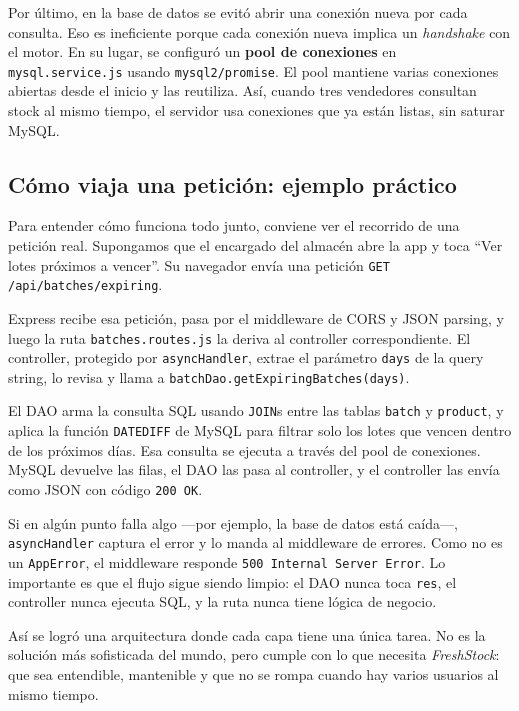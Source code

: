 \documentclass[journal]{IEEEtran}
\newcommand{\app}{\textit{FreshStock}}
\begin{document}
	Por \'{u}ltimo, en la base de datos se evit\'{o} abrir una
	conexi\'{o}n nueva por cada consulta. Eso es ineficiente porque
	cada conexi\'{o}n nueva implica un \emph{handshake} con el
	motor. En su lugar, se configur\'{o} un \textbf{pool de
		conexiones} en \texttt{mysql.service.js} usando
	\texttt{mysql2/promise}. El pool mantiene varias conexiones
	abiertas desde el inicio y las reutiliza. As\'{i}, cuando tres
	vendedores consultan stock al mismo tiempo, el servidor usa
	conexiones que ya est\'{a}n listas, sin saturar MySQL.
	
	\subsection{C\'{o}mo viaja una petici\'{o}n: ejemplo pr\'{a}ctico}
	\label{subsec:traza}
	
	Para entender c\'{o}mo funciona todo junto, conviene ver el
	recorrido de una petici\'{o}n real. Supongamos que el encargado
	del almac\'{e}n abre la app y toca ``Ver lotes pr\'{o}ximos a
	vencer''. Su navegador env\'{i}a una petici\'{o}n
	\texttt{GET /api/batches/expiring}.
	
	Express recibe esa petici\'{o}n, pasa por el middleware de CORS y
	JSON parsing, y luego la ruta \texttt{batches.routes.js} la
	deriva al controller correspondiente. El controller, protegido
	por \texttt{asyncHandler}, extrae el par\'{a}metro
	\texttt{days} de la query string, lo revisa y llama a
	\texttt{batchDao.getExpiringBatches(days)}.
	
	El DAO arma la consulta SQL usando \texttt{JOIN}s entre las
	tablas \texttt{batch} y \texttt{product}, y aplica la funci\'{o}n
	\texttt{DATEDIFF} de MySQL para filtrar solo los lotes que vencen
	dentro de los pr\'{o}ximos d\'{i}as. Esa consulta se ejecuta a
	trav\'{e}s del pool de conexiones. MySQL devuelve las filas, el
	DAO las pasa al controller, y el controller las env\'{i}a como
	JSON con c\'{o}digo \texttt{200 OK}.
	
	Si en alg\'{u}n punto falla algo ---por ejemplo, la base de datos
	est\'{a} ca\'{i}da---, \texttt{asyncHandler} captura el error y
	lo manda al middleware de errores. Como no es un \texttt{AppError},
	el middleware responde \texttt{500 Internal Server Error}. Lo
	importante es que el flujo sigue siendo limpio: el DAO nunca toca
	\texttt{res}, el controller nunca ejecuta SQL, y la ruta nunca
	tiene l\'{o}gica de negocio.
	
	As\'{i} se logr\'{o} una arquitectura donde cada capa tiene una
	\'{u}nica tarea. No es la soluci\'{o}n m\'{a}s sofisticada del
	mundo, pero cumple con lo que necesita \app{}: que sea entendible,
	mantenible y que no se rompa cuando hay varios usuarios al mismo
	tiempo.
	
\end{document}
